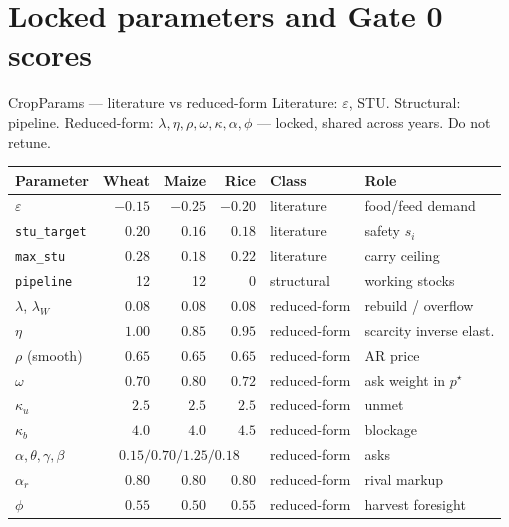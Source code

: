 \section{Locked parameters and Gate 0 scores}

\begin{frame}[label=cropparams]{CropParams --- literature vs reduced-form}
{\scriptsize Literature: $\varepsilon$, STU. Structural: pipeline.
Reduced-form: $\lambda,\eta,\rho,\omega,\kappa,\alpha,\phi$ --- locked,
shared across years. Do not retune.}
{\tiny
\renewcommand{\arraystretch}{0.80}
\setlength{\tabcolsep}{3.2pt}
\begin{tabular}{@{}lrrrll@{}}
\toprule
Parameter & Wheat & Maize & Rice & Class & Role \\
\midrule
$\varepsilon$ & $-0.15$ & $-0.25$ & $-0.20$ & literature & food/feed demand \\
\texttt{stu\_target} & $0.20$ & $0.16$ & $0.18$ & literature & safety $s_i$ \\
\texttt{max\_stu} & $0.28$ & $0.18$ & $0.22$ & literature & carry ceiling \\
\texttt{pipeline} & 12 & 12 & 0 & structural & working stocks \\
$\lambda$, $\lambda_W$ & $0.08$ & $0.08$ & $0.08$ & reduced-form & rebuild / overflow \\
$\eta$ & $1.00$ & $0.85$ & $0.95$ & reduced-form & scarcity inverse elast. \\
$\rho$ (smooth) & $0.65$ & $0.65$ & $0.65$ & reduced-form & AR price \\
$\omega$ & $0.70$ & $0.80$ & $0.72$ & reduced-form & ask weight in $p^\star$ \\
$\kappa_u$ & $2.5$ & $2.5$ & $2.5$ & reduced-form & unmet \\
$\kappa_b$ & $4.0$ & $4.0$ & $4.5$ & reduced-form & blockage \\
$\alpha,\theta,\gamma,\beta$ & \multicolumn{3}{c}{$0.15 / 0.70 / 1.25 / 0.18$} & reduced-form & asks \\
$\alpha_r$ & $0.80$ & $0.80$ & $0.80$ & reduced-form & rival markup \\
$\phi$ & $0.55$ & $0.50$ & $0.55$ & reduced-form & harvest foresight \\
\bottomrule
\end{tabular}}
\end{frame}

